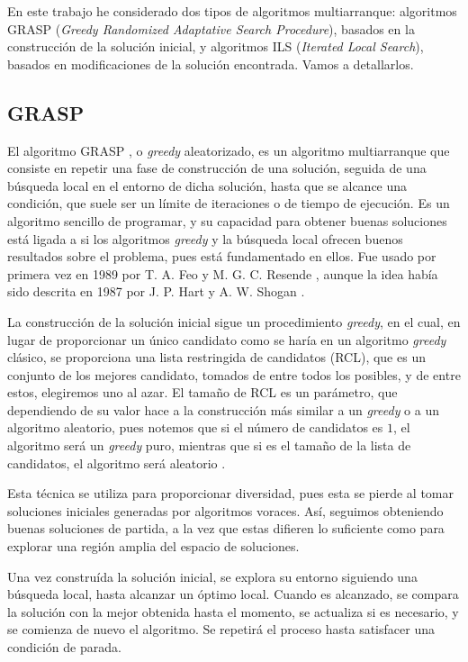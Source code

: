 En este trabajo he considerado dos tipos de algoritmos multiarranque: algoritmos GRASP
(\textit{Greedy Randomized Adaptative Search Procedure}), basados en la construcción
de la solución inicial, y algoritmos ILS (\textit{Iterated Local Search}), basados
en modificaciones de la solución encontrada. Vamos a detallarlos.

\subsection{GRASP}\label{grasp}

El algoritmo GRASP \citep{feo:1995}, o \textit{greedy} aleatorizado, es un algoritmo
multiarranque que consiste en repetir una fase de construcción de una solución,
seguida de una búsqueda local en el entorno de dicha solución, hasta que se alcance
una condición, que suele ser un límite de iteraciones o de tiempo de ejecución.
Es un algoritmo sencillo de programar, y su capacidad para obtener buenas soluciones
está ligada a si los algoritmos \textit{greedy} y la búsqueda local ofrecen buenos
resultados sobre el problema, pues está fundamentado en ellos. Fue usado por primera
vez en 1989 por T. A. Feo y M. G. C. Resende \citep{feo:1989}, aunque la idea había
sido descrita en 1987 por J. P. Hart y A. W. Shogan \citep{hart:1987}.

La construcción de la solución inicial sigue un procedimiento \textit{greedy}, en el cual,
en lugar de proporcionar un único candidato como se haría en un algoritmo \textit{greedy}
clásico, se proporciona una lista restringida de candidatos (RCL), que es un conjunto
de los mejores candidato, tomados de entre todos los posibles, y de entre estos,
elegiremos uno al azar. El tamaño de RCL es un parámetro, que dependiendo de su valor
hace a la construcción más similar a un \textit{greedy} o a un algoritmo aleatorio,
pues notemos que si el número de candidatos es $1$, el algoritmo será un \textit{greedy}
puro, mientras que si es el tamaño de la lista de candidatos, el algoritmo será aleatorio \citep{herrera:2014}.

Esta técnica se utiliza para proporcionar diversidad, pues esta se pierde al tomar soluciones
iniciales generadas por algoritmos voraces. Así, seguimos obteniendo buenas soluciones de
partida, a la vez que estas difieren lo suficiente como para explorar una región amplia del
espacio de soluciones.

Una vez construída la solución inicial, se explora su entorno siguiendo una búsqueda local,
hasta alcanzar un óptimo local. Cuando es alcanzado, se compara la solución con la mejor obtenida
hasta el momento, se actualiza si es necesario, y se comienza de nuevo el algoritmo.
Se repetirá el proceso hasta satisfacer una condición de parada.

